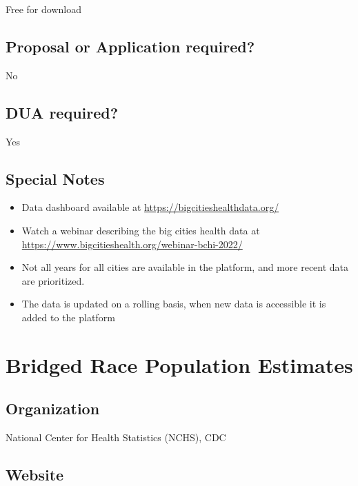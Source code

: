 \documentclass[
]{book}
\providecommand{\tightlist}{%
  \setlength{\itemsep}{0pt}\setlength{\parskip}{0pt}}
\begin{document}
Free for download

\hypertarget{proposal-or-application-required-13}{%
\section{Proposal or Application required?}\label{proposal-or-application-required-13}}

No

\hypertarget{dua-required-13}{%
\section{DUA required?}\label{dua-required-13}}

Yes

\hypertarget{special-notes-13}{%
\section{Special Notes}\label{special-notes-13}}

\begin{itemize}
\tightlist
\item
  Data dashboard available at \url{https://bigcitieshealthdata.org/}
\item
  Watch a webinar describing the big cities health data at \url{https://www.bigcitieshealth.org/webinar-bchi-2022/}
\item
  Not all years for all cities are available in the platform, and more recent data are prioritized.
\item
  The data is updated on a rolling basis, when new data is accessible it is added to the platform
\end{itemize}

\mainmatter

\hypertarget{bridged-race-population-estimates}{%
\chapter{Bridged Race Population Estimates}\label{bridged-race-population-estimates}}

\hypertarget{organization-14}{%
\section{Organization}\label{organization-14}}

National Center for Health Statistics (NCHS), CDC

\hypertarget{website-14}{%
\section{Website}\label{website-14}}
\end{document}
